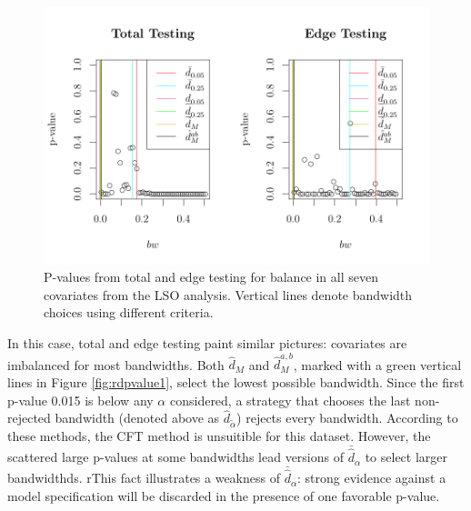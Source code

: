 \documentclass[12pt]{article}\usepackage[]{graphicx}\usepackage[]{color}
\makeatletter
\def\maxwidth{ %
  \ifdim\Gin@nat@width>\linewidth
    \linewidth
  \else
    \Gin@nat@width
  \fi
}
\newenvironment{knitrout}{}{} %
\newcommand{\dalphaU}{\bar{\hat{d}}_\alpha}
\newcommand{\dhat}{\hat{d}}
\newcommand{\dhatm}{\hat{d}_M}
\makeatother
\begin{document}
\begin{figure}
\begin{knitrout}
\color{fgcolor}
\includegraphics[width=\maxwidth]{figure/rdd-1} 

\end{knitrout}
\caption{P-values from total and edge testing for balance in all seven covariates
  from the LSO analysis. Vertical lines denote bandwidth choices using
  different criteria.}
\label{fig:rdpvalues1}
\end{figure}

In this case, total and edge testing paint similar pictures:
covariates are imbalanced for most bandwidths.
Both $\dhatm$ and $\dhat_M^{a,b}$, marked with a green vertical
lines in Figure \ref{fig:rdpvalue1}, select the lowest possible
bandwidth.
Since the first p-value 0.015 is below any $\alpha$
considered, a strategy that chooses the last non-rejected bandwidth
(denoted above as $\hat{d}_{\tilde{\alpha}}$) rejects every bandwidth.
According to these methods, the CFT method is unsuitible for this
dataset.
However, the scattered large p-values at some bandwidths lead versions
of $\dalphaU$ to select larger bandwidthds.
rThis fact illustrates a weakness of $\dalphaU$: strong evidence
against a model specification will be discarded in the presence of one
favorable p-value.
\end{document}

